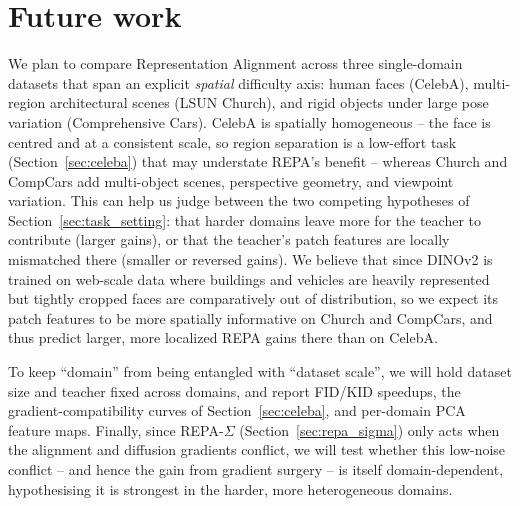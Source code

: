 \section{Future work}

We plan to compare Representation Alignment across three single-domain datasets that span an explicit \emph{spatial}
difficulty axis: human faces (CelebA), multi-region architectural scenes (LSUN Church), and rigid objects under large
pose variation (Comprehensive Cars). CelebA is spatially homogeneous -- the face is centred and at a consistent scale,
so region separation is a low-effort task (Section~\ref{sec:celeba}) that may understate REPA's benefit -- whereas
Church and CompCars add multi-object scenes, perspective geometry, and viewpoint variation. This can help us judge between the
two competing hypotheses of Section~\ref{sec:task_setting}: that harder domains leave more for the teacher to contribute
(larger gains), or that the teacher's patch features are locally mismatched there (smaller or reversed gains).
We believe that since DINOv2 is trained on web-scale data where buildings and vehicles are heavily
represented but tightly cropped faces are comparatively out of distribution, so we expect its patch features to be more
spatially informative on Church and CompCars, and thus predict larger, more localized REPA gains there than on CelebA.

To keep ``domain'' from being entangled with ``dataset scale'', we will hold dataset size and teacher fixed
across domains, and report FID/KID speedups, the gradient-compatibility curves of Section~\ref{sec:celeba}, and
per-domain PCA feature maps. Finally, since REPA-$\Sigma$ (Section~\ref{sec:repa_sigma}) only acts when the alignment
and diffusion gradients conflict, we will test whether this low-noise conflict -- and hence the gain from gradient
surgery -- is itself domain-dependent, hypothesising it is strongest in the harder, more heterogeneous domains.
